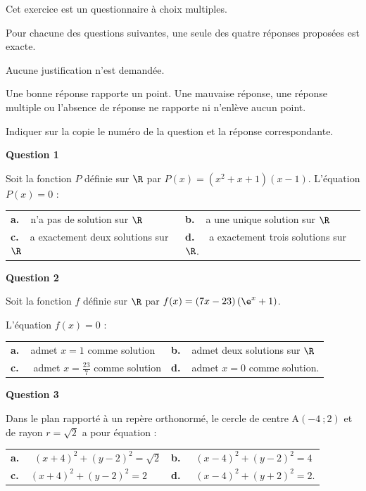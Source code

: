 \medskip

Cet exercice est un questionnaire à choix multiples.

Pour chacune des questions suivantes, une seule des quatre réponses proposées est exacte. 

Aucune justification n'est demandée.

Une bonne réponse rapporte un point. Une mauvaise réponse, une réponse multiple ou l'absence de réponse ne rapporte ni n'enlève aucun point.

Indiquer sur la copie le numéro de la question et la réponse correspondante.

\medskip

\textbf{Question 1}

\medskip 

Soit la fonction $P$ définie sur $\R$ par $P(x)=(x^2+x+1)(x-1)$.
L'équation $P(x)=0$ :

\medskip

\begin{tabularx}{\linewidth}{*{2}{X}}
\textbf{a.~~}n'a pas de solution sur $\R$ &\textbf{b.~~}a une unique solution sur $\R$ \\\textbf{c.~~}a exactement deux solutions sur $\R$& \textbf{d.~~} a exactement trois solutions sur $\R$.
\end{tabularx}

\medskip

\textbf{Question 2}

\medskip 

Soit la fonction $f$ définie sur $\R$ par $f(x) = (7x - 23)\left(\e^x+1\right)$.

L'équation $f(x)=0$ :

\medskip

\begin{tabularx}{\linewidth}{*{2}{X}}
\textbf{a.~~}admet $x=1$ comme solution &\textbf{b.~~}admet deux solutions sur $\R $\\\textbf{c.~~} admet $x=\frac{23}{7}$ comme solution & \textbf{d.~~}admet $x=0$ comme solution.
\end{tabularx}


\medskip

\textbf{Question 3}

\medskip 

Dans le plan rapporté à un repère orthonormé, le cercle de centre A$(-4~;2)$ et de rayon $r=\sqrt{2}$ a pour équation :

\medskip

\begin{tabularx}{\linewidth}{*{2}{X}}
\textbf{a.~~} $(x+4)^2+(y-2)^2=\sqrt{2} $ &\textbf{b.~~} $(x-4)^2+(y-2)^2=4 $\\\textbf{c.~~}$(x+4)^2+(y-2)^2=2 $& \textbf{d.~~} $(x-4)^2+(y+2)^2=2  $.
\end{tabularx}

